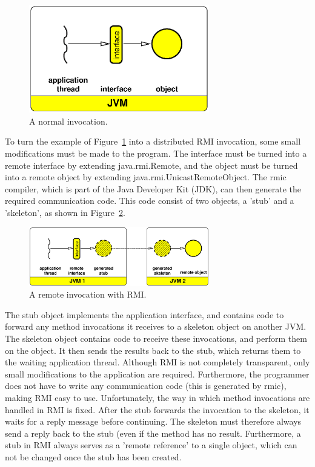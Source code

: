 \documentclass[10pt]{article}
\begin{document}
\begin{figure}[t]
\begin{center}
\includegraphics[width=0.7\textwidth]{normal.eps}
\end{center}
\caption{A normal invocation.}
\label{normal-fig}
\end{figure}

To turn the example of Figure~\ref{normal-fig} into a distributed RMI invocation,
some small modifications must be made to the program. The interface
must be turned into a remote interface by extending java.rmi.Remote,
and the object must be turned into a remote object by extending
java.rmi.UnicastRemoteObject. The rmic compiler, which is part of the
Java Developer Kit (JDK), can then generate the required communication
code. This code consist of two objects, a 'stub' and a 'skeleton', as
shown in Figure~\ref{rmi-fig}.

\begin{figure}[t]
\begin{center}
\includegraphics[width=0.7\textwidth]{rmi-abstract.eps}
\end{center}
\caption{A remote invocation with RMI.}
\label{rmi-fig}
\end{figure}

The stub object implements the application interface, and contains
code to forward any method invocations it receives to a skeleton
object on another JVM. The skeleton object contains code to receive
these invocations, and perform them on the object. It then sends the
results back to the stub, which returns them to the waiting
application thread.  Although RMI is not completely transparent, only
small modifications to the application are required. Furthermore, the
programmer does not have to write any communication code (this is
generated by rmic), making RMI easy to use. Unfortunately, the way in
which method invocations are handled in RMI is fixed. After the stub
forwards the invocation to the skeleton, it waits for a reply message
before continuing. The skeleton must therefore always send a reply
back to the stub (even if the method has no result. Furthermore, a
stub in RMI always serves as a 'remote reference' to a single object,
which can not be changed once the stub has been created.
\end{document}
